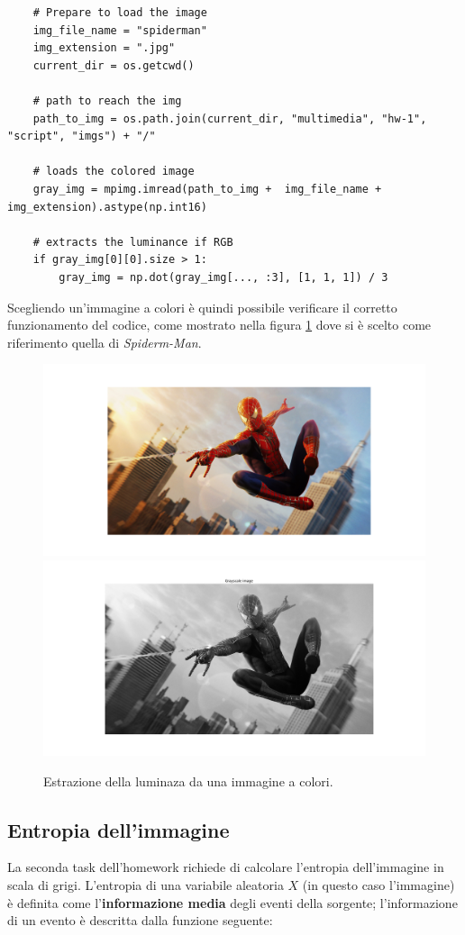 \begin{lstlisting}
    # Prepare to load the image
    img_file_name = "spiderman"
    img_extension = ".jpg"
    current_dir = os.getcwd()

    # path to reach the img
    path_to_img = os.path.join(current_dir, "multimedia", "hw-1", "script", "imgs") + "/"

    # loads the colored image
    gray_img = mpimg.imread(path_to_img +  img_file_name + img_extension).astype(np.int16)

    # extracts the luminance if RGB
    if gray_img[0][0].size > 1:
        gray_img = np.dot(gray_img[..., :3], [1, 1, 1]) / 3
\end{lstlisting}

\noindent Scegliendo un'immagine a colori è quindi possibile verificare il corretto funzionamento del codice, come mostrato nella figura \ref{fig:colored-grayscale} dove si è scelto come riferimento quella di \textsl{Spiderm-Man}.

\begin{figure}[h]
    \centering
    \includegraphics[width = .7\textwidth]{hw-1/report/imgs/colored.png}
    \includegraphics[width = .7\textwidth]{hw-1/report/imgs/grayscale.png}
    \caption{Estrazione della luminaza da una immagine a colori.}
    \label{fig:colored-grayscale}
\end{figure}



\subsection{Entropia dell'immagine}\label{img-entropy}
La seconda task dell'homework richiede di calcolare l'entropia dell'immagine in scala di grigi. L'entropia di una variabile aleatoria $X$ (in questo caso l'immagine) è definita come l'\textbf{informazione media} degli eventi della sorgente; l'informazione di un evento è descritta dalla funzione seguente:

